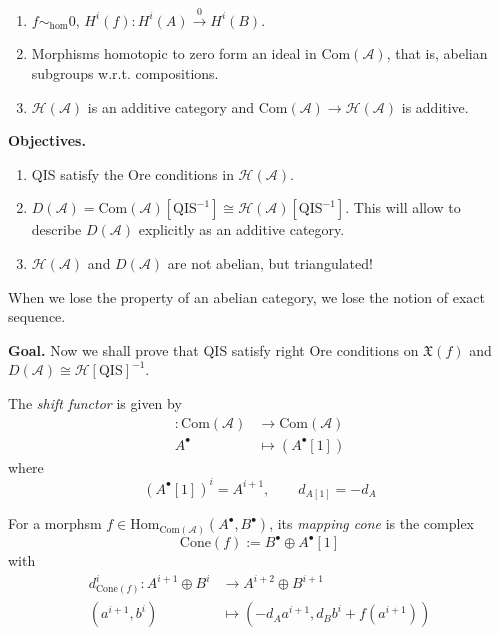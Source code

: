 \begin{exercise}
\label{exercise-homotopy-category}
\begin{enumerate}
\item $f\sim_{\text{hom}}0$, $H^i(f):H^i(A)\xrightarrow{0}H^i(B)$.
\item Morphisms homotopic to zero form an ideal in $\text{Com}(\mathcal{A})$,
that is, abelian subgroups w.r.t. compositions.
\item $\mathcal{H}(\mathcal{A})$ is an additive category and
$\text{Com}(\mathcal{A}) \to \mathcal{H}(\mathcal{A})$ is additive.
\end{enumerate}
\end{exercise}

{\bf Objectives.}
\begin{enumerate}
\item QIS satisfy the Ore conditions in $\mathcal{H}(\mathcal{A})$.
\item $D(\mathcal{A})=\text{Com}(\mathcal{A})[\text{QIS}^{-1}]
\cong \mathcal{H}(\mathcal{A})[\text{QIS}^{-1}]$. This will allow to describe
$D(\mathcal{A})$ explicitly as an additive category.
\item $\mathcal{H}(\mathcal{A})$ and $D(\mathcal{A})$ are not abelian, but
triangulated!
\end{enumerate}

When we lose the property of an abelian category, we lose the notion of exact
sequence.

{\bf Goal.} Now we shall prove that QIS satisfy right Ore conditions on
$\mathfrak{X}(f)$ and $D(\mathcal{A})\cong \mathcal{H}[\text{QIS}]^{-1}$.

\begin{definition}
\label{definition-shift-functor}
The {\it shift functor} is given by
\begin{align*}
[1]: \text{Com}(\mathcal{A}) &\longrightarrow \text{Com}(\mathcal{A}) \\
A^\bullet &\longmapsto (A^\bullet[1])
\end{align*}
where
$$
(A^\bullet[1])^i=A^{i+1},\qquad  d_{A[1]}=-d_A
$$
\end{definition}

\begin{definition}
\label{definition-mapping-cone}
For a morphsm $f \in
\text{Hom}_{\text{Com}(\mathcal{A})}(A^\bullet,B^{\bullet})$, its {\it mapping
cone} is the complex
$$
\text{Cone}(f):=B^{\bullet}\oplus A^{\bullet}[1]
$$
with
\begin{align*}
d_{\text{Cone}(f)}^i: A^{i+1}\oplus B^{i} &\longrightarrow A^{i+2}\oplus B^{i+1} \\
(a^{i+1},b^i) &\longmapsto (-d_Aa^{i+1},d_Bb^i+f(a^{i+1}))
\end{align*}
\end{definition}

